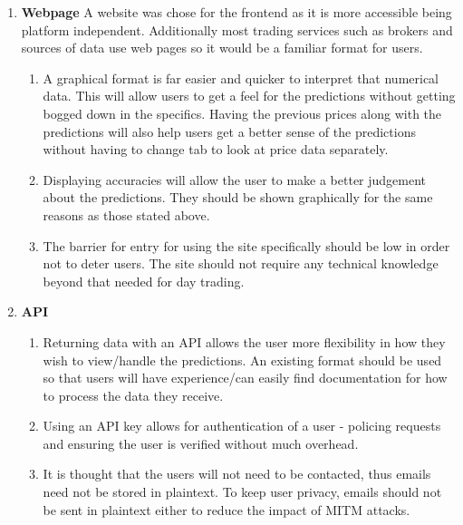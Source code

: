 \begin{enumerate}
            \item \textbf{Webpage} A website was chose for the frontend as it is more accessible being platform independent. Additionally most trading services such as brokers and sources of data use web pages so it would be a familiar format for users.
            
            \begin{enumerate}
                \item A graphical format is far easier and quicker to interpret that numerical data. This will allow users to get a feel for the predictions without getting bogged down in the specifics. Having the previous prices along with the predictions will also help users get a better sense of the predictions without having to change tab to look at price data separately.
                
                \item Displaying accuracies will allow the user to make a better judgement about the predictions. They should be shown graphically for the same reasons as those stated above.
                
                \item The barrier for entry for using the site specifically should be low in order not to deter users. The site should not require any technical knowledge beyond that needed for day trading.

            \end{enumerate}
    
            \item \textbf{API}
            
            \begin{enumerate}
                \item Returning data with an API allows the user more flexibility in how they wish to view/handle the predictions. An existing format should be used so that users will have experience/can easily find documentation for how to process the data they receive.
                
                \item Using an API key allows for authentication of a user - policing requests and ensuring the user is verified without much overhead.
                
                \item It is thought that the users will not need to be contacted, thus emails need not be stored in plaintext. To keep user privacy, emails should not be sent in plaintext either to reduce the impact of MITM attacks.  
    

\end{enumerate}
\end{enumerate}
